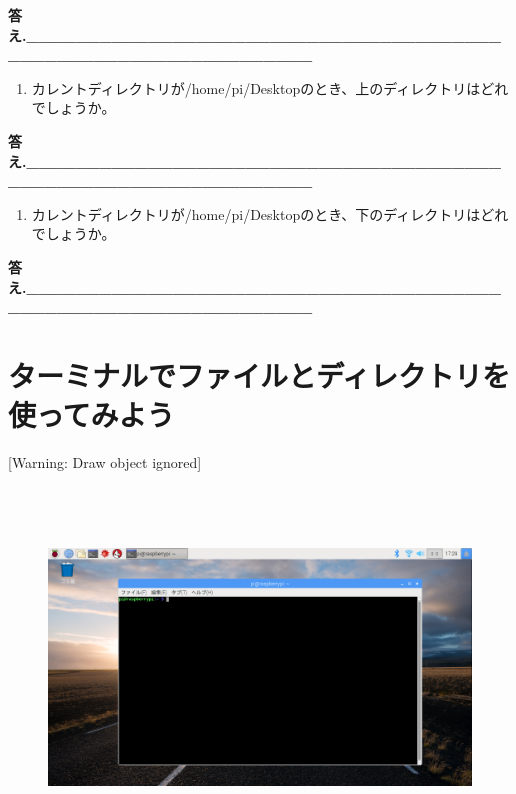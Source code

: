 \documentclass[a4paper,dvipdfmx]{jarticle}
\newcounter{saveenum}
\begin{document}
\bigskip

{\ttfamily\bfseries
答え.\_\_\_\_\_\_\_\_\_\_\_\_\_\_\_\_\_\_\_\_\_\_\_\_\_\_\_\_\_\_\_\_\_\_\_\_\_\_\_\_\_\_\_\_\_\_\_\_\_\_\_\_\_\_\_\_\_\_\_\_\_\_\_\_}


\bigskip

\setcounter{saveenum}{\value{enumi}}
\begin{enumerate}
\setcounter{enumi}{\value{saveenum}}
\item
カレントディレクトリが/home/pi/Desktopのとき、上のディレクトリはどれでしょうか。
\end{enumerate}

\bigskip


\bigskip

{\ttfamily\bfseries
答え.\_\_\_\_\_\_\_\_\_\_\_\_\_\_\_\_\_\_\_\_\_\_\_\_\_\_\_\_\_\_\_\_\_\_\_\_\_\_\_\_\_\_\_\_\_\_\_\_\_\_\_\_\_\_\_\_\_\_\_\_\_\_\_\_}


\bigskip

\setcounter{saveenum}{\value{enumi}}
\begin{enumerate}
\setcounter{enumi}{\value{saveenum}}
\item
カレントディレクトリが/home/pi/Desktopのとき、下のディレクトリはどれでしょうか。
\end{enumerate}

\bigskip


\bigskip

{\ttfamily\bfseries
答え.\_\_\_\_\_\_\_\_\_\_\_\_\_\_\_\_\_\_\_\_\_\_\_\_\_\_\_\_\_\_\_\_\_\_\_\_\_\_\_\_\_\_\_\_\_\_\_\_\_\_\_\_\_\_\_\_\_\_\_\_\_\_\_\_}

\clearpage\section{ターミナルでファイルとディレクトリを使ってみよう}
[Warning: Draw object ignored]

\begin{figure}
\centering
\includegraphics[width=17.006cm,height=9.56cm]{text03-img/text03-img006.png}
\end{figure}
\end{document}
